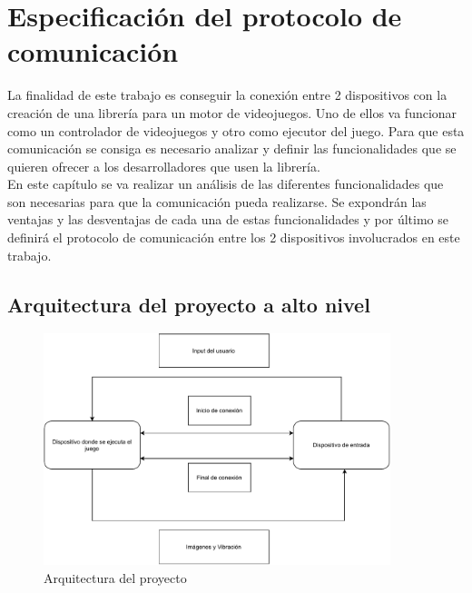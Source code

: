 


\begin{FraseCelebre}
\begin{Frase}
\end{Frase}
\begin{Fuente}
\end{Fuente}
\end{FraseCelebre}


\chapter{Especificaci\'on del protocolo de comunicaci\'on}
\label{cap3}
\label{cap:especificacion}


La finalidad de este trabajo es conseguir la conexi\'on entre 2 dispositivos con la creaci\'on de una librer\'ia para un motor de videojuegos. Uno de ellos va funcionar como un controlador de videojuegos y otro como ejecutor del juego. Para que esta comunicaci\'on se consiga es necesario analizar y definir las funcionalidades que se quieren ofrecer a los desarrolladores que usen la librer\'ia. \\

En este cap\'itulo se va realizar un an\'alisis de las diferentes funcionalidades que son necesarias para que la comunicaci\'on pueda realizarse. Se expondr\'an las ventajas y las desventajas de cada una de estas funcionalidades y por \'ultimo se definir\'a el protocolo de comunicaci\'on entre los 2 dispositivos involucrados en este trabajo.


\section{Arquitectura del proyecto a alto nivel}

\begin{figure}[!htb]
    \centering
    \includegraphics[width=0.90\textwidth]{./Imagenes/Vectorial/Diagrama protocolo.pdf}
    \caption{Arquitectura del proyecto}
\label{Fig:arquitectura}
\end{figure}

